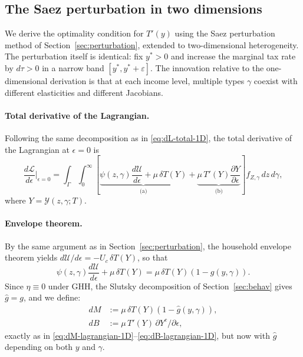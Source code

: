 \documentclass[12pt,a4paper]{article}
\theoremstyle{definition}
\theoremstyle{plain}
\theoremstyle{remark}
\newcommand{\calU}{\mathcal{U}}
\newcommand{\calL}{\mathcal{L}}
\newcommand{\calY}{\mathcal{Y}}
\begin{document}
\subsection{The Saez perturbation in two dimensions}
\label{sec:2D_perturbation}

We derive the optimality condition for $T'(y)$ using the Saez perturbation method of Section~\ref{sec:perturbation}, extended to two-dimensional heterogeneity.  The perturbation itself is identical: fix $y^* > 0$ and increase the marginal tax rate by $d\tau > 0$ in a narrow band $[y^*,y^*+\varepsilon]$.  The innovation relative to the one-dimensional derivation is that at each income level, multiple types $\gamma$ coexist with different elasticities and different Jacobians.

\paragraph{Total derivative of the Lagrangian.}
Following the same decomposition as in \eqref{eq:dL-total-1D}, the total derivative of the Lagrangian at $\epsilon = 0$ is
\begin{equation}
\label{eq:dL_2D}
  \frac{d\calL}{d\epsilon}\bigg|_{\epsilon=0}
  = \int_{\Gamma}\int_0^{\infty}\left[
    \underbrace{\psi(z,\gamma)\frac{d\calU}{d\epsilon} + \mu\,\delta T(Y)}_{\text{(a)}}
    + \underbrace{\mu\,T'(Y)\frac{\partial Y}{\partial\epsilon}}_{\text{(b)}}
  \right] f_{Z,\gamma}\,dz\,d\gamma,
\end{equation}
where $Y = \calY(z,\gamma;T)$.

\paragraph{Envelope theorem.}
By the same argument as in Section~\ref{sec:perturbation}, the household envelope theorem yields $d\calU/d\epsilon = -U_c\,\delta T(Y)$, so that
\[
  \psi(z,\gamma)\frac{d\calU}{d\epsilon} + \mu\,\delta T(Y) = \mu\,\delta T(Y)(1 - g(y,\gamma)).
\]
Since $\eta \equiv 0$ under GHH, the Slutsky decomposition of Section~\ref{sec:behav} gives $\hat{g} = g$, and we define:
\begin{align}
  dM &:= \mu\,\delta T(Y)(1 - \hat{g}(y,\gamma)), \label{eq:dM_2D}\\
  dB &:= \mu\,T'(Y)\,\partial Y^c/\partial\epsilon, \label{eq:dB_2D}
\end{align}
exactly as in \eqref{eq:dM-lagrangian-1D}--\eqref{eq:dB-lagrangian-1D}, but now with $\hat{g}$ depending on both $y$ and $\gamma$.
\end{document}
